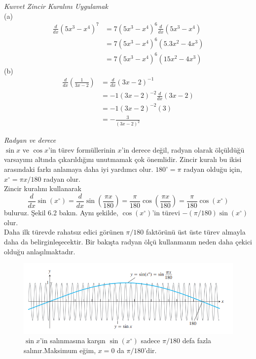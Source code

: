 \begin{ornek}\textit{Kuvvet Zincir Kuralını Uygulamak}\\
(a)\begin{equation*}
	\begin{split}
	\frac{d}{dx}(5x^3-x^4)^7&=7(5x^3-x^4)^6\frac{d}{dx}(5x^3-x^4)\\
		&=7(5x^3-x^4)^6(5.3x^2-4x^3)\\
		&=7(5x^3-x^4)^6(15x^2-4x^3)
	\end{split}
	\end{equation*}
(b)\begin{equation*}
	\begin{split}
	\frac{d}{dx}\left(\frac{1}{3x-2}\right)&=\frac{d}{dx}(3x-2)^{-1}\\
		&=-1(3x-2)^{-2}\frac{d}{dx}(3x-2)\\
		&=-1(3x-2)^{-2}(3)\\
		&=-\frac{3}{(3x-2)^2}
	\end{split}
	\end{equation*}
\end{ornek}
\begin{ornek}\textit{Radyan ve derece}\\
$\sin x$ ve $\cos x$'in türev formüllerinin $x$'in derece değil, radyan olarak ölçüldüğü varsayımı altında çıkarıldığını unutmamak çok önemlidir. Zincir kuralı bu ikisi arasındaki farkı anlamaya daha iyi yardımcı olur. $180^{\circ}=\pi$ radyan olduğu için, $x^{\circ}=\pi x/180$ radyan olur.\\
Zincir kuralını kullanarak
	\begin{equation*}
	\frac{d}{dx}\sin(x^{\circ})=\frac{d}{dx}\sin \left(\frac{\pi x}{180}\right) =\frac{\pi}{180}\cos \left( \frac{\pi x}{180} \right)=\frac{\pi}{180}\cos (x^{\circ})
	\end{equation*}
buluruz. Şekil 6.2 bakın. Aynı şekilde, $\cos (x^{\circ})$'in türevi $-(\pi / 180)\sin(x^{\circ})$ olur.\\
Daha ilk türevde rahatsız edici görünen $\pi /180$ faktörünü üst üste türev almayla daha da belirginleşecektir. Bir bakışta radyan ölçü kullanmanın neden daha çekici olduğu anlaşılmaktadır.
\begin{figure}[H]
	\centering
	\includegraphics[width=0.8\linewidth]{sinusradyan.png}
	\caption{$\sin x$'in salınmasına karşın $\sin(x^{\circ})$ sadece $\pi / 180$ defa fazla salınır.Maksimum  eğim, $x=0$ da $\pi /180$'dir.}
	\label{fig:ornekresim}
\end{figure}
\end{ornek}
